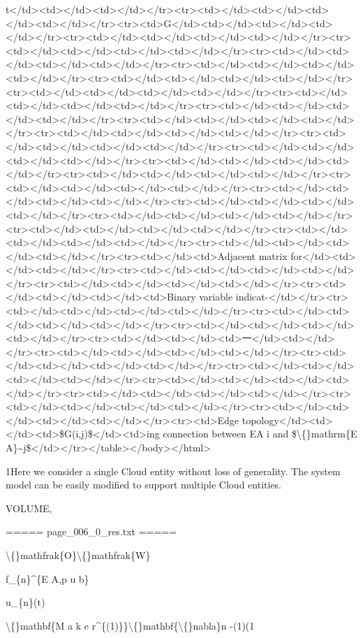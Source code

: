 \documentclass{article}
\begin{document}
t</td><td></td><td></td></tr><tr><td></td><td></td><td></td><td></td></tr><tr><td>G</td><td></td><td></td><td></td></tr><tr><td></td><td></td><td></td><td></td></tr><tr><td></td><td></td><td></td><td></td></tr><tr><td></td><td></td><td></td><td></td></tr><tr><td></td><td></td><td></td><td></td></tr><tr><td></td><td></td><td></td><td></td></tr><tr><td></td><td></td><td></td><td></td></tr><tr><td></td><td></td><td></td><td></td></tr><tr><td></td><td></td><td></td><td></td></tr><tr><td></td><td></td><td></td><td></td></tr><tr><td></td><td></td><td></td><td></td></tr><tr><td></td><td></td><td></td><td></td></tr><tr><td></td><td></td><td></td><td></td></tr><tr><td></td><td></td><td></td><td></td></tr><tr><td></td><td></td><td></td><td></td></tr><tr><td></td><td></td><td></td><td></td></tr><tr><td></td><td></td><td></td><td></td></tr><tr><td></td><td></td><td></td><td></td></tr><tr><td></td><td></td><td></td><td></td></tr><tr><td></td><td></td><td></td><td></td></tr><tr><td></td><td></td><td></td><td></td></tr><tr><td></td><td></td><td></td><td></td></tr><tr><td></td><td>Adjacent matrix for</td><td></td><td></td></tr><tr><td></td><td></td><td></td><td></td></tr><tr><td></td><td></td><td></td><td></td></tr><tr><td></td><td></td><td></td><td>Binary variable indicat-</td></tr><tr><td></td><td></td><td></td><td></td></tr><tr><td></td><td></td><td></td><td></td></tr><tr><td></td><td></td><td></td><td></td></tr><tr><td></td><td></td><td>一</td><td></td></tr><tr><td></td><td></td><td></td><td></td></tr><tr><td></td><td></td><td></td><td></td></tr><tr><td></td><td></td><td></td><td></td></tr><tr><td></td><td></td><td></td><td></td></tr><tr><td></td><td></td><td></td><td></td></tr><tr><td></td><td></td><td></td><td></td></tr><tr><td></td><td></td><td></td><td></td></tr><tr><td>Edge topology</td><td></td><td>\$G(i,j)\$</td><td>ing connection between EA i and \$\textbackslash\{\}mathrm\{E A\}\textasciitilde{}j\$</td></tr></table></body></html>

1Here we consider a single Cloud entity without loss of generality. The system model can be easily modified to support multiple Cloud entities.

VOLUME,

===== page\_006\_0\_res.txt =====


\textbackslash\{\}mathfrak\{O\}\textbackslash\{\}mathfrak\{W\}

f\_\{n\}\textasciicircum{}\{E A,p u b\}

u\_\{n\}(t)

\textbackslash\{\}mathbf\{M a k e r\textasciicircum{}\{(1)\}\}\textbackslash\{\}mathbf\{\textbackslash\{\}nabla\}n -(1)(1
\end{document}
